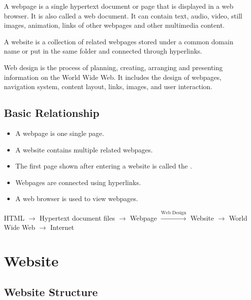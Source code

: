 \begin{definitionbox}[Webpage]
    A webpage is a single hypertext document or page that is displayed in a web browser. It is also called a web document. It can contain text, audio, video, still images, animation, links of other webpages and other multimedia content.
\end{definitionbox}

\begin{definitionbox}[Website]
    A website is a collection of related webpages stored under a common domain name or put in the same folder and connected through hyperlinks.
\end{definitionbox}

\begin{definitionbox}
    Web design is the process of planning, creating, arranging and presenting information on the World Wide Web. It includes the design of webpages, navigation system, content layout, links, images, and user interaction.
\end{definitionbox}

\subsection{Basic Relationship}

\begin{itemize}
    \item A webpage is one single page.
    \item A website contains multiple related webpages.
    \item The first page shown after entering a website is called the .
    \item Webpages are connected using hyperlinks.
    \item A web browser is used to view webpages.
\end{itemize}

\begin{summarybox}
    HTML $\rightarrow$ Hypertext document files $\rightarrow$ Webpage $\xrightarrow{\text{Web Design}}$ Website $\rightarrow$ World Wide Web $\rightarrow$ Internet
\end{summarybox}

\section{Website}

\subsection{Website Structure}

